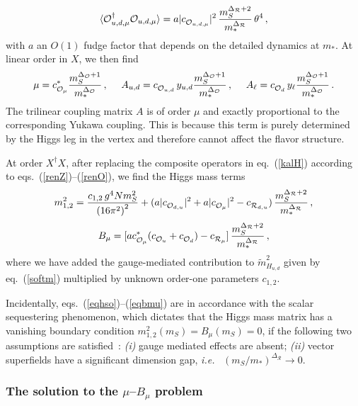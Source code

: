 \documentclass[a4paper,12pt]{article}
\newcommand{\beq}{\begin{equation}}
\newcommand{\eeq}{\end{equation}}
\def\eq#1{eq.~(\ref{#1})}
\def\eq#1{eq.~(\ref{#1})}
\def\O{\mathcal{O}}
\def\R{\mathcal{R}}
\def\mst{m_*}
\def\mS{m_S}
\begin{document}
\beq
\langle \O_{u,d,\mu}^\dagger \O_{u,d,\mu}\rangle = a|c_{\raisebox{-1.0pt}{$\scriptstyle {{\O}_{u,d,\mu}}$}} |^2 \, \frac{\mS^{\Delta_\R +2}}{\mst^{\Delta_\R}}\, \theta^4\, ,
\label{renO}
\eeq
with $a$ an $O(1)$  fudge factor that depends on the detailed dynamics at $\mst$.
At linear order in $X$, we then find
\beq
\mu = c^*_{\raisebox{-1.0pt}{$\scriptstyle {{\O}_{\mu}}$}}
 \frac{\mS^{\Delta_\O +1}}{\mst^{\Delta_\O}} \, , ~~~~
A_{u,d}= c_{\raisebox{-1.0pt}{$\scriptstyle {{\O}_{u,d}}$}}
 \, y_{u,d}\frac{\mS^{\Delta_\O +1}}{\mst^{\Delta_\O}}\, , ~~~~A_\ell =
c_{\raisebox{-1.0pt}{$\scriptstyle {{\O}_{d}}$}}\,  y_{\ell}\frac{\mS^{\Delta_\O +1}}{\mst^{\Delta_\O}}\, .
\label{eqmu}
\eeq
The trilinear coupling  matrix $A$ is of order $\mu$ and exactly proportional to the corresponding Yukawa coupling. This is because this term is purely determined by  the Higgs leg in the vertex and therefore cannot affect the flavor structure. 

At order  $X^\dagger X$, after replacing the composite operators in \eq{kalH} according to eqs.~(\ref{renZ})--(\ref{renO}), we find the Higgs mass terms 
\beq
m_{1,2}^2= 
\frac{c_{1,2}\, g^4 N\mS^2}{{(16\pi^2)}^2}+
( a |
c_{\raisebox{-1.0pt}{$\scriptstyle {{\O}_{d,u}}$}}
|^2 + a|
c_{\raisebox{-1.0pt}{$\scriptstyle {{\O}_{\mu}}$}}
|^2- 
c_{\raisebox{-1.0pt}{$\scriptstyle {{\R}_{d,u}}$}}
)\, \frac{\mS^{\Delta_\R +2}}{\mst^{\Delta_\R}}\, ,
\label{eqhso}
\eeq
\beq
B_\mu = [a 
c^*_{\raisebox{-1.0pt}{$\scriptstyle {{\O}_{\mu}}$}}
(
c_{\raisebox{-1.0pt}{$\scriptstyle {{\O}_{u}}$}}
+ 
c_{\raisebox{-1.0pt}{$\scriptstyle {{\O}_{d}}$}}
)- 
c_{\raisebox{-1.0pt}{$\scriptstyle {{\R}_{\mu}}$}}
]\, \frac{\mS^{\Delta_\R +2}}{\mst^{\Delta_\R}}\, ,
\label{eqbmu}
\eeq
where we have added the gauge-mediated  contribution to ${\tilde m}_{H_{u,d}}^2$ given by \eq{softm} multiplied  by unknown order-one parameters 
$c_{1,2}$.

Incidentally, eqs.~(\ref{eqhso})--(\ref{eqbmu}) are in accordance with the scalar sequestering phenomenon, which dictates that the Higgs mass matrix has a vanishing boundary condition $m_{1,2}^2(\mS)=B_\mu (\mS)=0$, if the following two assumptions are satisfied~\cite{Roy:2007nz,Murayama:2007ge,Perez:2008ng}: {\it (i)} gauge mediated effects are absent; {\it (ii)} vector superfields have a significant dimension gap, {\it i.e.} ~$(\mS/\mst)^{\Delta_\R}\to 0$.

\boldmath
\subsubsection*{The solution to the $\mu$--$B_\mu$ problem}
\unboldmath
\end{document}

